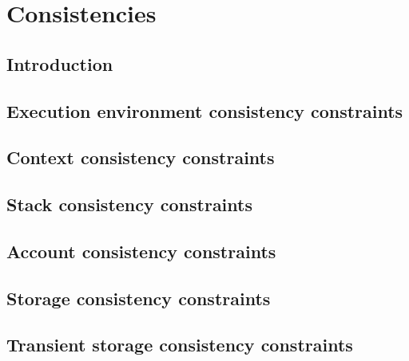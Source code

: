 

\section{Consistencies}                                                      \label{hub: consistencies}
\subsection{Introduction}                                                    \label{hub: consistencies: intro}                               \newpage
\subsection{Execution environment consistency constraints \lispDone{}}       \label{hub: consistencies: environment}           \newpage
\subsection{Context               consistency constraints \lispDone{}}       \label{hub: consistencies: context}                   \newpage
\subsection{Stack                 consistency constraints \lispDone{}}       \label{hub: consistencies: stack}                       \newpage
\subsection{Account               consistency constraints \lispDone{}}       \label{hub: consistencies: account}                   \newpage
\subsection{Storage               consistency constraints \lispDone{}}       \label{hub: consistencies: storage}                   \newpage
\subsection{Transient storage     consistency constraints \lispTodo{}}       \label{hub: consistencies: transient storage}       \newpage
